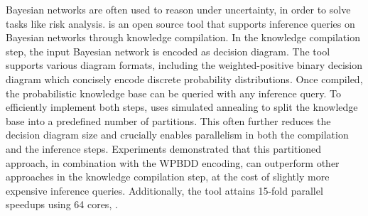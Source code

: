 
Bayesian networks are often used to reason under uncertainty,
in order to solve tasks like risk analysis.
\toolname is an open source tool that supports inference queries on Bayesian networks through knowledge compilation.
In the knowledge compilation step, the input Bayesian network is encoded as decision diagram. The tool supports various diagram formats, including the weighted-positive binary decision diagram which concisely encode discrete probability distributions.
Once compiled, the probabilistic knowledge base can be queried with any inference query.
To efficiently implement both steps, \toolname uses simulated annealing to split the knowledge base into a predefined number of partitions. This often further reduces the decision diagram size and crucially enables parallelism in both the compilation and the inference steps.
Experiments demonstrated that this partitioned approach, in combination with the WPBDD encoding, can outperform other approaches in the knowledge compilation step, at the cost of slightly more expensive inference queries.
Additionally, the tool attains 15-fold parallel speedups using 64 cores, .





